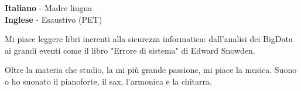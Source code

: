 \documentclass[9pt]{developercv} %
\begin{document}

\begin{minipage}[t]{0.3\textwidth}
	\vspace{-\baselineskip} %


	\textbf{Italiano} - Madre lingua\\
	\textbf{Inglese} - Esaustivo (PET)\\
\end{minipage}
\hfill
\begin{minipage}[t]{0.3\textwidth}
	\vspace{-\baselineskip} %


	Mi piace leggere libri inerenti alla sicurezza informatica: dall'analisi dei BigData ai grandi eventi come il libro "Errore di sistema" di Edward Snowden.
\end{minipage}
\hfill
\begin{minipage}[t]{0.3\textwidth}
	\vspace{-\baselineskip} %


	Oltre la materia che studio, la mi più grande passione, mi piace la musica. Suono o ho suonato il pianoforte, il sax, l'armonica e la chitarra.
\end{minipage}

\end{document}

